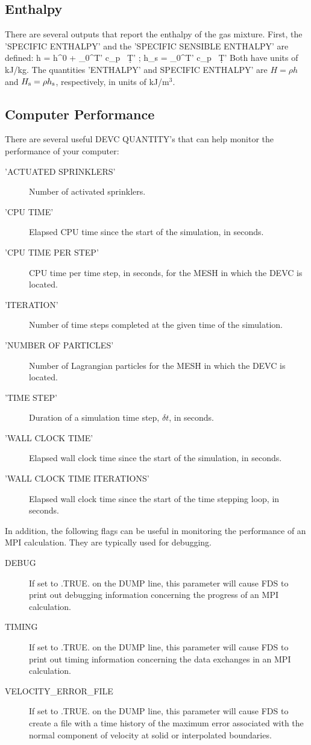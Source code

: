 \documentclass[11pt]{book}
\begin{document}
\subsection{Enthalpy}
\label{info:enthalpy}

There are several outputs that report the enthalpy of the gas mixture. First, the {\ct 'SPECIFIC ENTHALPY'} and the {\ct 'SPECIFIC SENSIBLE ENTHALPY'} are defined:
\be
   h = h^0 + \int_0^{T'} c_p \, \d T'  \quad ; \quad h_{\rm s} = \int_0^{T'} c_p \, \d T'
\ee
Both have units of kJ/kg. The quantities {\ct 'ENTHALPY'} and {\ct SPECIFIC ENTHALPY'} are $H=\rho h$ and $H_{\rm s}=\rho h_{\rm s}$, respectively, in units of kJ/m$^3$.


\subsection{Computer Performance}
\label{info:TIMING}

There are several useful {\ct DEVC} {\ct QUANTITY}'s that can help monitor the performance of your computer:
\begin{description}
\item[{\ct 'ACTUATED SPRINKLERS'}] Number of activated sprinklers.
\item[{\ct 'CPU TIME'}] Elapsed CPU time since the start of the simulation, in seconds.
\item[{\ct 'CPU TIME PER STEP'}] CPU time per time step, in seconds, for the {\ct MESH} in which the {\ct DEVC} is located.
\item[{\ct 'ITERATION'}] Number of time steps completed at the given time of the simulation.
\item[{\ct 'NUMBER OF PARTICLES'}] Number of Lagrangian particles for the {\ct MESH} in which the {\ct DEVC} is located.
\item[{\ct 'TIME STEP'}] Duration of a simulation time step, $\delta t$, in seconds.
\item[{\ct 'WALL CLOCK TIME'}] Elapsed wall clock time since the start of the simulation, in seconds.
\item[{\ct 'WALL CLOCK TIME ITERATIONS'}] Elapsed wall clock time since the start of the time stepping loop, in seconds.
\end{description}
In addition, the following flags can be useful in monitoring the performance of an MPI calculation. They are typically used for debugging.
\begin{description}
\item[{\ct DEBUG}]  If set to {\ct .TRUE.} on the {\ct DUMP} line, this parameter will cause FDS to print out debugging information concerning the progress of an MPI calculation.
\item[{\ct TIMING}] If set to {\ct .TRUE.} on the {\ct DUMP} line, this parameter will cause FDS to print out timing information concerning the data exchanges in an MPI calculation.
\item[{\ct VELOCITY\_ERROR\_FILE}] If set to {\ct .TRUE.} on the {\ct DUMP} line, this parameter will cause FDS to create a file with a time history of the maximum error associated with the normal component of velocity at solid or interpolated boundaries.
\end{description}
\end{document}
